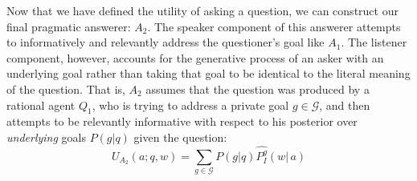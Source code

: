 \documentclass[11pt, floatsintext]{apa6}
\begin{document}
%


Now that we have defined the utility of asking a question, we can construct our final pragmatic answerer: $A_2$. The speaker component of this answerer attempts to informatively and relevantly address the questioner's goal like $A_1$. The listener component, however, accounts for the generative process of an asker with an underlying goal rather than taking that goal to be identical to the literal meaning of the question. That is, $A_2$ assumes that the question was produced by a rational agent $Q_1$, who is trying to address a private goal $g \in \mathcal{G}$, and then attempts to be relevantly informative with respect to his posterior over \emph{underlying} goals $P(g|q)$ given the question:
\begin{equation}
U_{A_2}(a; q, w) = \sum_{g \in \mathcal{G}} P(g|q) \widehat{P^g_I}(w|\,a)
\end{equation}
\end{document}
